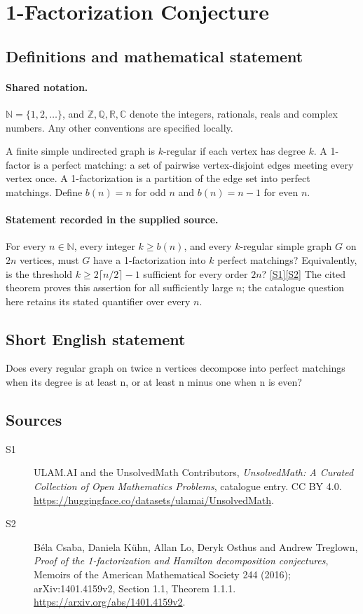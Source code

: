 \documentclass[11pt]{article}
\newcommand{\sref}[2]{\hyperlink{source:#1:#2}{[S#2]}}
\begin{document}
\section{1-Factorization Conjecture}\label{statement}

\subsection{Definitions and mathematical statement}

\paragraph{Shared notation.}$\mathbb N=\{1,2,\ldots\}$, and $\mathbb Z,\mathbb Q,\mathbb R,\mathbb C$ denote the integers, rationals, reals and complex numbers. Any other conventions are specified locally.


A finite simple undirected graph is $k$-regular if each vertex has degree $k$. A 1-factor is a perfect matching: a set of pairwise vertex-disjoint edges meeting every vertex once. A 1-factorization is a partition of the edge set into perfect matchings. Define $b(n)=n$ for odd $n$ and $b(n)=n-1$ for even $n$.
\paragraph{Statement recorded in the supplied source.}
For every $n\in\mathbb N$, every integer $k\ge b(n)$, and every $k$-regular simple graph $G$ on $2n$ vertices, must $G$ have a 1-factorization into $k$ perfect matchings? Equivalently, is the threshold $k\ge2\lceil n/2\rceil-1$ sufficient for every order $2n$? \sref{statement}{1}\sref{statement}{2}
The cited theorem proves this assertion for all sufficiently large $n$; the catalogue question here retains its stated quantifier over every $n$.
\subsection{Short English statement}
Does every regular graph on twice n vertices decompose into perfect matchings when its degree is at least n, or at least n minus one when n is even?
\subsection{Sources}
\begin{description}
\item[\hypertarget{source:statement:1}{S1}] ULAM.AI and the UnsolvedMath Contributors, \emph{UnsolvedMath: A Curated Collection of Open Mathematics Problems}, catalogue entry. CC BY 4.0. \url{https://huggingface.co/datasets/ulamai/UnsolvedMath}.
\item[\hypertarget{source:statement:2}{S2}] Béla Csaba, Daniela Kühn, Allan Lo, Deryk Osthus and Andrew Treglown, \emph{Proof of the 1-factorization and Hamilton decomposition conjectures}, Memoirs of the American Mathematical Society 244 (2016); arXiv:1401.4159v2, Section 1.1, Theorem 1.1.1. \url{https://arxiv.org/abs/1401.4159v2}.
\end{description}
\label{end:statement}
\end{document}
